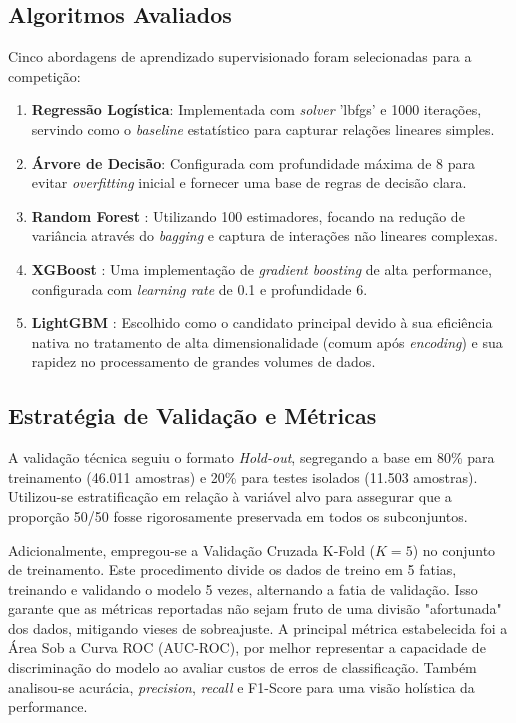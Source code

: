 \documentclass[12pt]{article}
\begin{document}
\subsection{Algoritmos Avaliados}
Cinco abordagens de aprendizado supervisionado foram selecionadas para a competição:
\begin{enumerate}
    \item \textbf{Regressão Logística}: Implementada com \textit{solver} 'lbfgs' e 1000 iterações, servindo como o \textit{baseline} estatístico para capturar relações lineares simples.
    \item \textbf{Árvore de Decisão}: Configurada com profundidade máxima de 8 para evitar \textit{overfitting} inicial e fornecer uma base de regras de decisão clara.
    \item \textbf{Random Forest} \cite{breiman2001random}: Utilizando 100 estimadores, focando na redução de variância através do \textit{bagging} e captura de interações não lineares complexas.
    \item \textbf{XGBoost} \cite{chen2016xgboost}: Uma implementação de \textit{gradient boosting} de alta performance, configurada com \textit{learning rate} de 0.1 e profundidade 6.
    \item \textbf{LightGBM} \cite{ke2017lightgbm}: Escolhido como o candidato principal devido à sua eficiência nativa no tratamento de alta dimensionalidade (comum após \textit{encoding}) e sua rapidez no processamento de grandes volumes de dados.
\end{enumerate}

\subsection{Estratégia de Validação e Métricas}
A validação técnica seguiu o formato \textit{Hold-out}, segregando a base em 80\% para treinamento (46.011 amostras) e 20\% para testes isolados (11.503 amostras). Utilizou-se estratificação em relação à variável alvo para assegurar que a proporção 50/50 fosse rigorosamente preservada em todos os subconjuntos.

Adicionalmente, empregou-se a Validação Cruzada K-Fold ($K=5$) no conjunto de treinamento. Este procedimento divide os dados de treino em 5 fatias, treinando e validando o modelo 5 vezes, alternando a fatia de validação. Isso garante que as métricas reportadas não sejam fruto de uma divisão "afortunada" dos dados, mitigando vieses de sobreajuste. A principal métrica estabelecida foi a Área Sob a Curva ROC (AUC-ROC), por melhor representar a capacidade de discriminação do modelo ao avaliar custos de erros de classificação. Também analisou-se acurácia, \textit{precision}, \textit{recall} e F1-Score para uma visão holística da performance.
\end{document}
